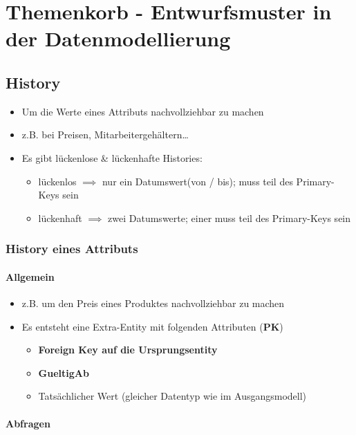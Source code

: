 \chapter{Themenkorb - Entwurfsmuster in der Datenmodellierung}
\section{History}
\begin{itemize}
    \item Um die Werte eines Attributs nachvollziehbar zu machen
    \item z.B. bei Preisen, Mitarbeitergehältern\dots
    \item Es gibt lückenlose \& lückenhafte Histories:
    \begin{itemize}
        \item lückenlos $\implies$ nur ein Datumswert(von / bis); muss teil des Primary-Keys sein
        \item lückenhaft $\implies$ zwei Datumswerte; einer muss teil des Primary-Keys sein
    \end{itemize}
\end{itemize}

\subsection{History eines Attributs}
\subsubsection{Allgemein}
\begin{itemize}
    \item z.B. um den Preis eines Produktes nachvollziehbar zu machen
    \item Es entsteht eine Extra-Entity mit folgenden Attributen (\textbf{PK})
    \begin{itemize}
        \item \textbf{Foreign Key auf die Ursprungsentity}
        \item \textbf{GueltigAb}
        \item Tatsächlicher Wert (gleicher Datentyp wie im Ausgangsmodell)
    \end{itemize}
\end{itemize}
\subsubsection{Abfragen}
